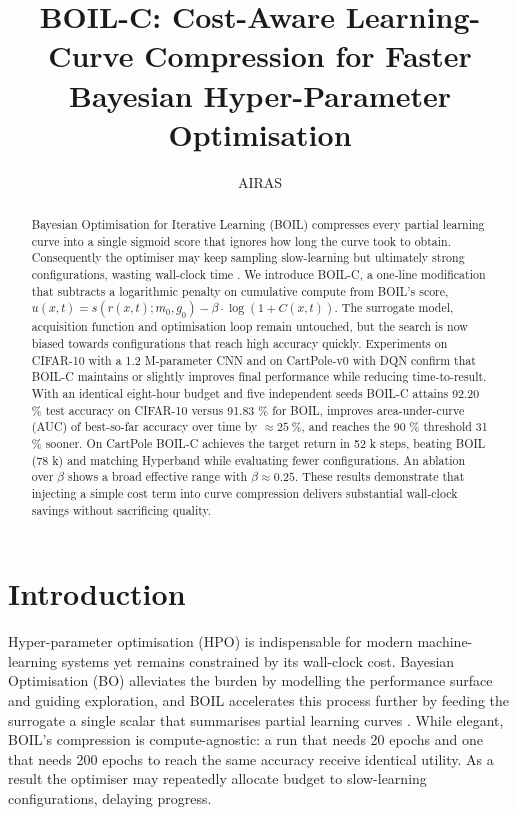 \documentclass{article} %
\title{BOIL-C: Cost-Aware Learning-Curve Compression for Faster Bayesian Hyper-Parameter Optimisation}
\author{AIRAS}
\begin{document}
\maketitle

\begin{abstract}
Bayesian Optimisation for Iterative Learning (BOIL) compresses every partial learning curve into a single sigmoid score that ignores how long the curve took to obtain. Consequently the optimiser may keep sampling slow-learning but ultimately strong configurations, wasting wall-clock time \cite{nguyen-2019-bayesian}. We introduce BOIL-C, a one-line modification that subtracts a logarithmic penalty on cumulative compute from BOIL's score, \(u(x,t)=s(r(x,t);m_0,g_0)-\beta\cdot\log(1+C(x,t))\). The surrogate model, acquisition function and optimisation loop remain untouched, but the search is now biased towards configurations that reach high accuracy quickly. Experiments on CIFAR-10 with a 1.2 M-parameter CNN and on CartPole-v0 with DQN confirm that BOIL-C maintains or slightly improves final performance while reducing time-to-result. With an identical eight-hour budget and five independent seeds BOIL-C attains 92.20 \% test accuracy on CIFAR-10 versus 91.83 \% for BOIL, improves area-under-curve (AUC) of best-so-far accuracy over time by \(\approx 25\ \%\), and reaches the 90 \% threshold 31 \% sooner. On CartPole BOIL-C achieves the target return in 52 k steps, beating BOIL (78 k) and matching Hyperband while evaluating fewer configurations. An ablation over \(\beta\) shows a broad effective range with \(\beta\approx 0.25\). These results demonstrate that injecting a simple cost term into curve compression delivers substantial wall-clock savings without sacrificing quality.
\end{abstract}

\section{Introduction}
\label{sec:intro}
Hyper-parameter optimisation (HPO) is indispensable for modern machine-learning systems yet remains constrained by its wall-clock cost. Bayesian Optimisation (BO) alleviates the burden by modelling the performance surface and guiding exploration, and BOIL accelerates this process further by feeding the surrogate a single scalar that summarises partial learning curves \cite{nguyen-2019-bayesian}. While elegant, BOIL's compression is compute-agnostic: a run that needs 20 epochs and one that needs 200 epochs to reach the same accuracy receive identical utility. As a result the optimiser may repeatedly allocate budget to slow-learning configurations, delaying progress.
\end{document}
